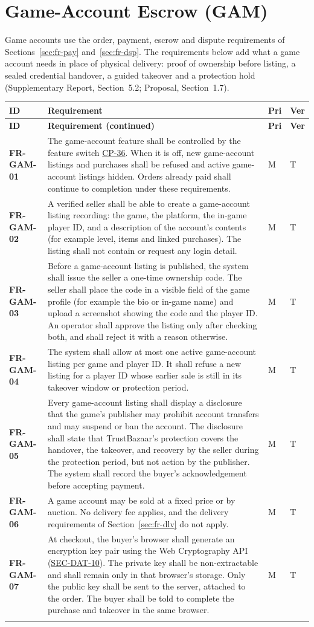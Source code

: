 \documentclass[11pt,a4paper]{report}
\makeatletter
\newenvironment{reqs}{%
  \small
  \begin{longtable}{@{}>{\raggedright\arraybackslash}p{2.35cm}
                       >{\raggedright\arraybackslash}p{10.3cm}
                       >{\centering\arraybackslash}p{0.7cm}
                       >{\centering\arraybackslash}p{0.7cm}@{}}
  \toprule
  \textbf{ID} & \textbf{Requirement} & \textbf{Pri} & \textbf{Ver} \\
  \midrule
  \endfirsthead
  \toprule
  \textbf{ID} & \textbf{Requirement (continued)} & \textbf{Pri} & \textbf{Ver} \\
  \midrule
  \endhead
  \bottomrule
  \endfoot
}{\end{longtable}}
\newcommand{\req}[5]{\leavevmode\textbf{#1}\hypertarget{#1}{} & #5 & #2 & #3 \\ \addlinespace[2pt]}
\newcommand{\rr}[1]{\hyperlink{#1}{#1}}
\newcommand{\cp}[1]{\hyperlink{#1}{#1}}
\makeatother
\begin{document}
\section{Game-Account Escrow (GAM)}
\label{sec:fr-gam}
Game accounts use the order, payment, escrow and dispute requirements of Sections~\ref{sec:fr-pay} and~\ref{sec:fr-dsp}. The requirements below add what a game account needs in place of physical delivery: proof of ownership before listing, a sealed credential handover, a guided takeover and a protection hold (Supplementary Report, Section~5.2; Proposal, Section~1.7).
\begin{reqs}
\req{FR-GAM-01}{M}{T}{C-6}{The game-account feature shall be controlled by the feature switch \cp{CP-36}. When it is off, new game-account listings and purchases shall be refused and active game-account listings hidden. Orders already paid shall continue to completion under these requirements.}
\req{FR-GAM-02}{M}{T}{FR-92}{A verified seller shall be able to create a game-account listing recording: the game, the platform, the in-game player ID, and a description of the account's contents (for example level, items and linked purchases). The listing shall not contain or request any login detail.}
\req{FR-GAM-03}{M}{T}{FR-93}{Before a game-account listing is published, the system shall issue the seller a one-time ownership code. The seller shall place the code in a visible field of the game profile (for example the bio or in-game name) and upload a screenshot showing the code and the player ID. An operator shall approve the listing only after checking both, and shall reject it with a reason otherwise.}
\req{FR-GAM-04}{M}{T}{FR-94}{The system shall allow at most one active game-account listing per game and player ID. It shall refuse a new listing for a player ID whose earlier sale is still in its takeover window or protection period.}
\req{FR-GAM-05}{M}{T}{FR-95}{Every game-account listing shall display a disclosure that the game's publisher may prohibit account transfers and may suspend or ban the account. The disclosure shall state that TrustBazaar's protection covers the handover, the takeover, and recovery by the seller during the protection period, but not action by the publisher. The system shall record the buyer's acknowledgement before accepting payment.}
\req{FR-GAM-06}{M}{T}{new}{A game account may be sold at a fixed price or by auction. No delivery fee applies, and the delivery requirements of Section~\ref{sec:fr-dlv} do not apply.}
\req{FR-GAM-07}{M}{T}{FR-96}{At checkout, the buyer's browser shall generate an encryption key pair using the Web Cryptography API (\rr{SEC-DAT-10}). The private key shall be non-extractable and shall remain only in that browser's storage. Only the public key shall be sent to the server, attached to the order. The buyer shall be told to complete the purchase and takeover in the same browser.}

\end{reqs}
\end{document}
